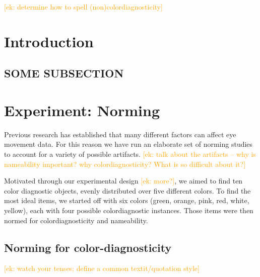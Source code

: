 \documentclass[a4paper,man,floatsintext,natbib,donotrepeattitle]{apa6}
\newcommand{\ek}[1]{\textcolor{Orange}{[ek: #1]}}
\begin{document}





\clearpage

\setcounter{page}{2}
\tableofcontents

\setcounter{secnumdepth}{3}

\clearpage

\ek{determine how to spell (non)colordiagnosticity}

\section{Introduction}
\setcounter{page}{1}

\subsection{SOME SUBSECTION}\label{sec:somesubsection}

\section{Experiment: Norming} \label{experiment}

Previous research has established that many different factors can affect eye movement data. For this reason we have run an elaborate set of norming studies to account for a variety of possible artifacts. \ek{talk about the artifacts -- why is nameability important? why colordiagnosticity? What is so difficult about it?}

Motivated through our experimental design \ek{more?}, we aimed to find ten color diagnostic objects, evenly distributed over five different colors. To find the most ideal items, we started off with six colors (green, orange, pink, red, white, yellow), each with four possible colordiagnostic instances. Those items were then normed for colordiagnosticity and nameability. 

\subsection{Norming for color-diagnosticity}

\ek{watch your tenses; define a common textit/quotation style}

\end{document}
